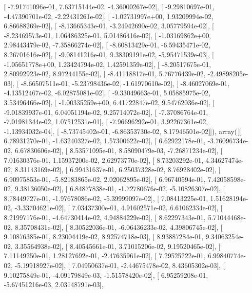 \documentclass{article}
\begin{document}
       [ -7.91741096e-01,   7.63715144e-02,  -4.36000267e-02],
       [ -9.29810697e-01,  -4.47390701e-02,  -2.22431261e-02],
       [ -1.02731997e+00,   1.93209994e-02,   6.86688269e-02],
       [ -8.13665343e-01,  -3.24942690e-02,   3.05779594e-02],
       [ -8.23469573e-01,   1.06486325e-01,   5.01486416e-02],
       [ -1.03169862e+00,   2.98443479e-02,  -7.35866274e-02],
       [ -8.60813429e-01,  -6.59435471e-02,   8.26701616e-02],
       [ -9.08141216e-01,   9.38309191e-02,  -5.95471539e-03],
       [ -1.05651778e+00,   1.23424794e-02,   1.42591359e-02],
       [ -8.20517675e-01,   2.80992923e-02,   8.97244155e-02],
       [ -8.41118817e-01,   5.76776439e-02,  -2.49898205e-03],
       [ -8.66507511e-01,  -5.23798436e-02,  -1.61970610e-02],
       [ -8.46027069e-01,  -4.13512467e-02,  -6.02875081e-02],
       [ -9.33049663e-01,   5.05885975e-02,   3.53496466e-02],
       [ -1.00335259e+00,   6.41722847e-02,   9.54762036e-02],
       [ -9.01839937e-01,   6.04051194e-02,   9.25714072e-02],
       [ -7.37086764e-01,  -7.01981344e-02,   1.07512531e-01],
       [ -7.96696292e-01,   3.92267361e-02,  -1.13934032e-04],
       [ -8.73745402e-01,  -6.86353730e-02,   8.17946501e-02]]), array([[  6.78931270e-01,  -1.63240327e-02,   1.57300622e-02],
       [  6.62922178e-01,  -3.76096734e-02,   6.67830606e-02],
       [  8.53571095e-01,   8.58090479e-03,  -7.26871234e-02],
       [  7.01630376e-01,   1.15937200e-02,   2.62973770e-02],
       [  8.73203292e-01,   4.34627474e-02,   8.31143169e-02],
       [  6.99431637e-01,   6.25037328e-02,   8.76928402e-02],
       [  6.90975853e-01,  -5.82183865e-02,   2.02062895e-02],
       [  6.96740594e-01,   7.42058598e-02,   9.38136050e-02],
       [  6.84877838e-01,  -1.72780676e-02,  -5.10826307e-02],
       [  8.78449727e-01,  -1.97678086e-02,  -5.39999097e-02],
       [  7.08413225e-01,   1.51628194e-02,  -3.33704621e-02],
       [  7.03437300e-01,   4.91602571e-02,   6.61062334e-02],
       [  8.21997176e-01,  -4.64730414e-02,   4.94884229e-02],
       [  8.62297343e-01,   5.71044468e-02,   8.35708431e-02],
       [  8.30522036e-01,  -6.06436233e-02,   4.39806745e-02],
       [  9.10876385e-01,   8.23004419e-02,   8.92574718e-03],
       [  8.93887284e-01,   9.34063254e-02,   3.35564938e-02],
       [  8.40545661e-01,   3.71015206e-02,   9.19520465e-02],
       [  7.11149250e-01,   1.28127692e-01,  -2.47635961e-02],
       [  7.29525222e-01,   6.99840774e-02,  -5.19918927e-02],
       [  7.04950637e-01,  -2.44675478e-02,   8.43605302e-03],
       [  9.10275849e-01,  -4.09179849e-03,  -1.51578420e-02],
       [  6.95259208e-01,  -5.67451216e-03,   2.03148791e-03],
\end{document}

